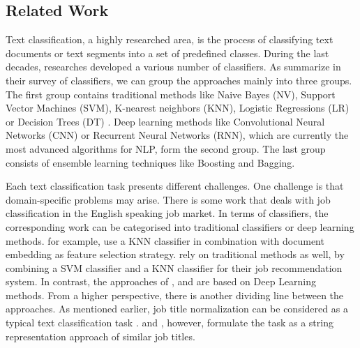 \documentclass[a4paper]{article}
\begin{document}
\subsection{Related Work}
Text classification, a highly researched area, is the process of classifying text documents or text segments into a set of predefined classes. During the last decades, researches developed a various number of classifiers. As \cite{Kowsari2019} summarize in their survey of classifiers, we can group the approaches mainly into three groups. The first group contains traditional methods like Naive Bayes (NV), Support Vector Machines (SVM), K-nearest neighbors (KNN),  Logistic Regressions (LR) or Decision Trees (DT) \citep{Vijayan2017, Colas2006, Kowsari2019, Sebastiani2001}. Deep learning methods like Convolutional Neural Networks (CNN) or Recurrent Neural Networks (RNN), which are currently the most advanced algorithms for NLP, form the second group. The last group consists of ensemble learning techniques like Boosting and Bagging.

Each text classification task presents different challenges. One challenge is that domain-specific problems may arise. There is some work that deals with job classification in the English speaking job market. 
In terms of classifiers, the corresponding work can be categorised into traditional classifiers or deep learning methods. \cite{Zhu2017} for example, use a KNN classifier in combination with document embedding as feature selection strategy. \cite{Javed2015} rely on traditional methods as well, by combining a SVM classifier and a KNN classifier for their job recommendation system. In contrast, the approaches of \cite{Decorte2021}, \cite{WangJ2019} and \cite{Neculoiu2016} are based on Deep Learning methods. From a higher perspective, there is another dividing line between the approaches. As mentioned earlier, job title normalization can be considered as a typical text classification task \citep{WangJ2019, Javed2015, Zhu2017}. \cite{Decorte2021} and \cite{Neculoiu2016}, however, formulate the task as a string representation approach of similar job titles.  
\end{document}

